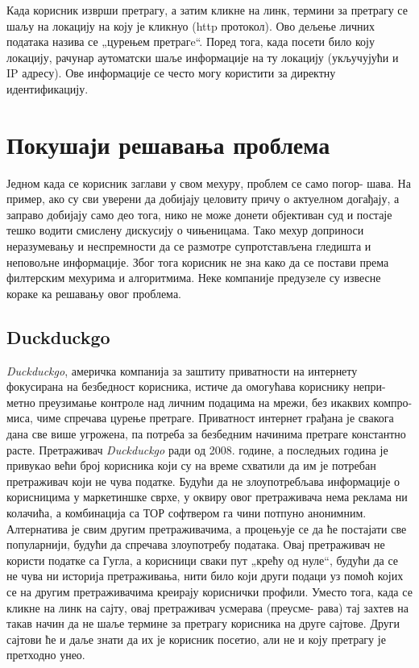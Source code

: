 \documentclass[a4paper]{article}
\begin{document}
Када корисник изврши претрагу, а затим кликне на линк, термини за претрагу се шаљу на локацију на коју је кликнуо (http протокол). Ово дељење личних података назива се „цурењем претрагe“. Поред тога, када посети било коју локацију, рачунар аутоматски шаље информације на ту локацију (укључујући и IP адресу). Ове информације се често могу користити за директну идентификацију.


\newpage
\section{Покушаји решавања проблема}
\label{sec:naslov3}

Једном када се корисник заглави у свом мехуру, проблем се само погор-
шава. На пример, ако су сви уверени да добијају целовиту причу о актуелном догађају, а заправо добијају само део тога, нико не може донети објективан суд и постаје тешко водити смислену дискусију о чињеницама. Тако мехур доприноси неразумевању и неспремности да се размотре супротстављена гледишта и неповољне информације. Због тога корисник не зна како да се постави према филтерским мехурима и алгоритмима. Неке компаније предузеле су извесне кораке ка решавању овог проблема.

\subsection{Duckduckgo}
\label{podnaslov7}

\emph{Duckduckgo}, америчка компанија за заштиту приватности на интернету фокусирана на безбедност корисника, истиче да омогућава кориснику непри-
метно преузимање контроле над личним подацима на мрежи, без икаквих компро-
миса, чиме спречава цурење претраге. Приватност интернет грађана је свакога дана све више угрожена, па потреба за безбедним начинима претраге константно расте. Претраживач \emph{Duckduckgo} ради од 2008. године, а последњих година је привукао већи број корисника који су на време схватили да им је потребан претраживач који не чува податке. Будући да не злоупотребљава информације о корисницима у маркетиншке сврхе, у оквиру овог претраживача нема реклама ни колачића, а комбинација са ТОР софтвером га чини потпуно анонимним. Алтернатива је свим другим претраживачима, а процењује се да ће постајати све популарнији, будући да спречава злоупотребу података. Овај претраживач не користи податке са Гугла, а корисници сваки пут „крећу од нуле“, будући да се не чува ни историја претраживања, нити било који други подаци уз помоћ којих се на другим претраживачима креирају кориснички профили. Уместо тога, када се кликне на линк на сајту, овај претраживач усмерава (преусме-
рава) тај захтев на такав начин да не шаље термине за претрагу корисника на друге сајтове. Други сајтови ће и даље знати да их је корисник посетио, али не и коју претрагу је претходно унео. 
\end{document}
